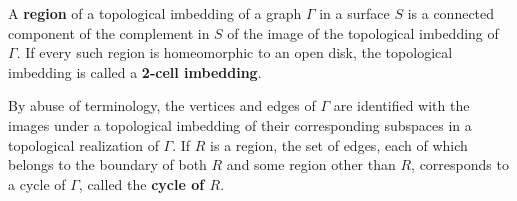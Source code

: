 A \textbf{region} of a topological imbedding of a graph $\Gamma$ in a surface $S$ is a connected component of the complement in $S$ of the image of the topological imbedding of $\Gamma$. If every such region is homeomorphic to an open disk, the topological imbedding is called a \textbf{2-cell imbedding}.

By abuse of terminology, the vertices and edges of $\Gamma$ are identified with the images under a topological imbedding of their corresponding subspaces in a topological realization of $\Gamma$. If $R$ is a region, the set of edges, each of which belongs to the boundary of both $R$ and some region other than $R$, corresponds to a cycle of $\Gamma$, called the \textbf{cycle of $R$}.
